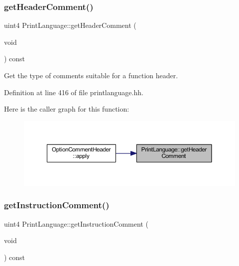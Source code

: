 \subsubsection{\texorpdfstring{getHeaderComment()}{getHeaderComment()}}
{\footnotesize\ttfamily uint4 Print\+Language\+::get\+Header\+Comment (\begin{DoxyParamCaption}\item[{void}]{ }\end{DoxyParamCaption}) const\hspace{0.3cm}{\ttfamily [inline]}}



Get the type of comments suitable for a function header. 



Definition at line 416 of file printlanguage.\+hh.

Here is the caller graph for this function\+:
\nopagebreak
\begin{figure}[H]
\begin{center}
\leavevmode
\includegraphics[width=350pt]{class_print_language_a7bd125967537d3ba37ca4534818257b2_icgraph}
\end{center}
\end{figure}
\mbox{\label{class_print_language_a221d681401ac7dbeda9d1abb82b04863}} 
\subsubsection{\texorpdfstring{getInstructionComment()}{getInstructionComment()}}
{\footnotesize\ttfamily uint4 Print\+Language\+::get\+Instruction\+Comment (\begin{DoxyParamCaption}\item[{void}]{ }\end{DoxyParamCaption}) const\hspace{0.3cm}{\ttfamily [inline]}}



